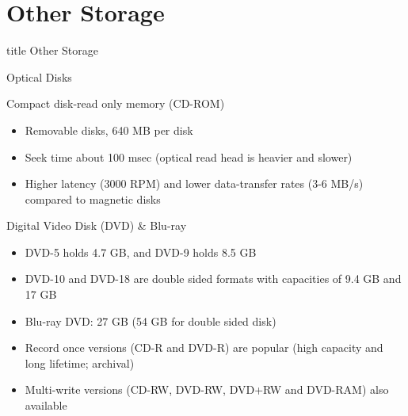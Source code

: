 \documentclass[aspectratio=169, xcolor=dvipsnames]{beamer}
\begin{document}
\section{Other Storage}

\begin{frame}
  \vfill
  \centering
  \begin{beamercolorbox}[sep=8pt,center,shadow=true,rounded=true]{title}
    Other Storage\par%
  \end{beamercolorbox}
  \vfill
\end{frame}

\begin{frame}{Optical Disks}
    \begin{block}{Compact disk-read only memory (CD-ROM)}
        \begin{itemize}[<+->]
            \item Removable disks, 640 MB per disk
            \item Seek time about 100 msec (optical read head is heavier and slower)
            \item Higher latency (3000 RPM) and lower data-transfer rates (3-6 MB/s) compared to magnetic disks
        \end{itemize}
    \end{block}
    \begin{block}{Digital Video Disk (DVD) \& Blu-ray}
        \begin{itemize}[<+->]
            \item DVD-5 holds 4.7 GB, and DVD-9 holds 8.5 GB
            \item DVD-10 and DVD-18 are double sided formats with capacities of 9.4 GB and 17 GB
            \item Blu-ray DVD: 27 GB (54 GB for double sided disk)
            \item Record once versions (CD-R and DVD-R) are popular (high capacity and long lifetime; archival)
            \item Multi-write versions (CD-RW, DVD-RW, DVD+RW and DVD-RAM) also available
        \end{itemize}
    \end{block}
\end{frame}
\end{document}
